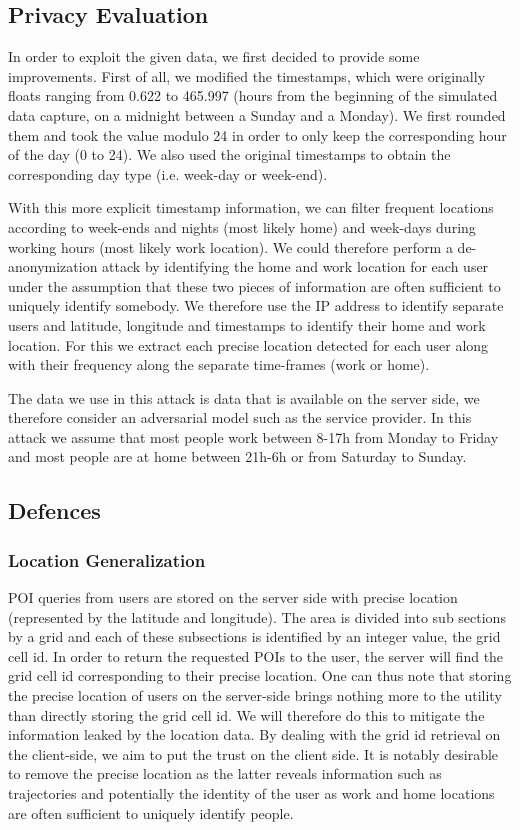 \documentclass[10pt,conference,compsocconf]{IEEEtran}
\begin{document}
\subsection{Privacy Evaluation}

In order to exploit the given data, we first decided to provide some improvements. First of all, we modified the timestamps, which were originally floats ranging from 0.622 to 465.997 (hours from the beginning of the simulated data capture, on a midnight between a Sunday and a Monday). We first rounded them and took the value modulo 24 in order to only keep the corresponding hour of the day (0 to 24). We also used the original timestamps to obtain the corresponding day type (i.e. week-day or week-end).

With this more explicit timestamp information, we can filter frequent locations according to week-ends and nights (most likely home) and week-days during working hours (most likely work location). We could therefore perform a de-anonymization attack by identifying the home and work location for each user under the assumption that these two pieces of information are often sufficient to uniquely identify somebody. We therefore use the IP address to identify separate users and latitude, longitude and timestamps to identify their home and work location. For this we extract each precise location detected for each user along with their frequency along the separate time-frames (work or home). 

The data we use in this attack is data that is available on the server side, we therefore consider an adversarial model such as the service provider. In this attack we assume that most people work between 8-17h from Monday to Friday and most people are at home between 21h-6h or from Saturday to Sunday.  

\subsection{Defences}

\subsubsection{Location Generalization}
POI queries from users are stored on the server side with precise location (represented by the latitude and longitude). The area is divided into sub sections by a grid and each of these subsections is identified by an integer value, the grid cell id. In order to return the requested POIs to the user, the server will find the grid cell id corresponding to their precise location. One can thus note that storing the precise location of users on the server-side brings nothing more to the utility than directly storing the grid cell id. We will therefore do this to mitigate the information leaked by the location data. By dealing with the grid id retrieval on the client-side, we aim to put the trust on the client side. It is notably desirable to remove the precise location as the latter reveals information such as trajectories and potentially the identity of the user as work and home locations are often sufficient to uniquely identify people.  
\end{document}
